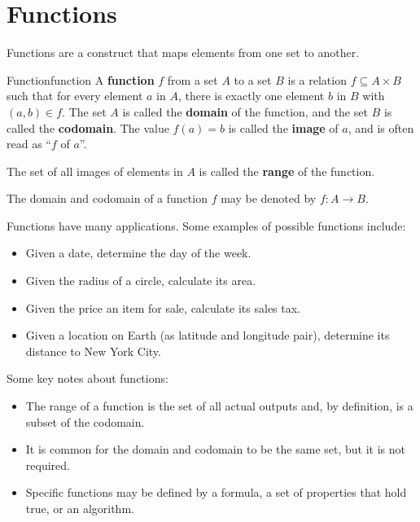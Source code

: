 \section{Functions}

Functions are a construct that maps elements from one set to another.

\begin{definition}{Function}{function}
  A \textbf{function} \( f \) from a set \( A \) to a set \( B \) is a relation
  \( f \subseteq A \times B \) such that for every element \( a \) in \( A \),
  there is exactly one element \( b \) in \( B \) with \( (a, b) \in f \).
  The set \( A \) is called the \textbf{domain} of the function, and the set
  \( B \) is called the \textbf{codomain}. The value \( f(a) = b \) is called the
  \textbf{image} of \( a \), and is often read as ``\( f \) of \( a \)''.

  \medskip

  The set of all images of elements in \( A \) is called the \textbf{range} of
  the function.

  \medskip

  The domain and codomain of a function \( f \) may be denoted by \( f: A \to B \).
\end{definition}

Functions have many applications. Some examples of possible functions include:
\begin{itemize}
  \item Given a date, determine the day of the week.
  \item Given the radius of a circle, calculate its area.
  \item Given the price an item for sale, calculate its sales tax.
  \item Given a location on Earth (as latitude and longitude pair), determine its distance to
    New York City.
\end{itemize}

Some key notes about functions:
\begin{itemize}
  \item The range of a function is the set of all actual outputs and, by
    definition, is a subset of the codomain.
  \item It is common for the domain and codomain to be the same set, but it is not
    required.
  \item Specific functions may be defined by a formula, a set of properties that hold true,
    or an algorithm.
\end{itemize}

